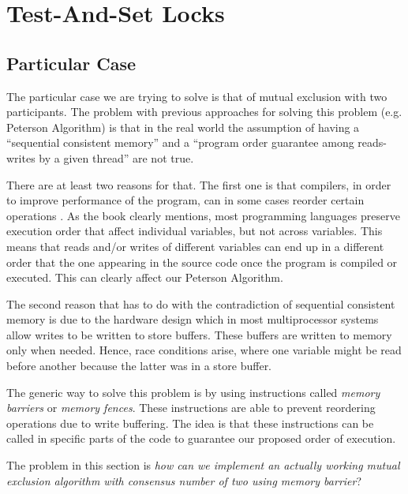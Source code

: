 \section{\textbf{Test-And-Set Locks}}
\subsection{Particular Case}
\par
The particular case we are trying to solve is that of mutual exclusion with two
participants. The problem with previous approaches for solving this problem
(e.g. Peterson Algorithm) is that in the real world the assumption of having a
``sequential consistent memory'' and a ``program order guarantee among
reads-writes by a given thread'' are not true.
\par
There are at least two reasons for that. The first one is that compilers, in
order to improve performance of the program, can in some cases reorder certain
operations . As the book clearly mentions, most programming languages preserve
execution order that affect individual variables, but not across variables. This
means that reads and/or writes of different variables can end up in a different
order that the one appearing in the source code once the program is compiled or
executed. This can clearly affect our Peterson Algorithm.
\par
The second reason that has to do with the contradiction of sequential consistent
memory is due to the hardware design which in most multiprocessor systems allow
writes to be written to store buffers. These buffers are written to memory only
when needed. Hence, race conditions arise, where one variable might be read
before another because the latter was in a store buffer.
\par
The generic way to solve this problem is by using instructions called 
\textit{memory barriers} or \textit{memory fences}. These instructions are able to
prevent reordering operations due to write buffering. The idea is that these
instructions can be called in specific parts of the code to guarantee our
proposed order of execution.
\par
The problem in this section is \textit{how can we implement an actually working
mutual exclusion algorithm with consensus number of two using memory barrier}?
\par
